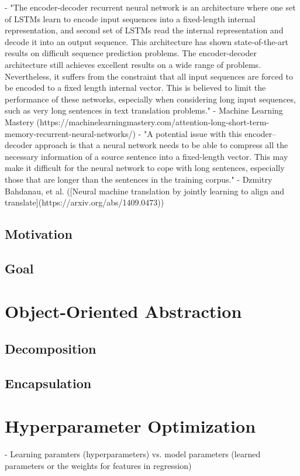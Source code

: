 \documentclass[11pt, oneside]{article}
\begin{document}
- "The encoder-decoder recurrent neural network is an architecture where one set of LSTMs learn to encode input sequences into a fixed-length internal representation, and second set of LSTMs read the internal representation and decode it into an output sequence. This architecture has shown state-of-the-art results on difficult sequence prediction problems. The encoder-decoder architecture still achieves excellent results on a wide range of problems. Nevertheless, it suffers from the constraint that all input sequences are forced to be encoded to a fixed length internal vector. This is believed to limit the performance of these networks, especially when considering long input sequences, such as very long sentences in text translation problems." - Machine Learning Mastery (https://machinelearningmastery.com/attention-long-short-term-memory-recurrent-neural-networks/)
- "A potential issue with this encoder–decoder approach is that a neural network needs to be able to compress all the necessary information of a source sentence into a fixed-length vector. This may make it difficult for the neural network to cope with long sentences, especially those that are longer than the sentences in the training corpus." - Dzmitry Bahdanau, et al. ([Neural machine translation by jointly learning to align and translate](https://arxiv.org/abs/1409.0473))

\subsection{Motivation}
\subsection{Goal}

\section{Object-Oriented Abstraction}
\subsection{Decomposition}
\subsection{Encapsulation}

\section{Hyperparameter Optimization}
- Learning paramters (hyperparameters) vs. model parameters (learned parameters or the weights for features in regression)
\end{document}
